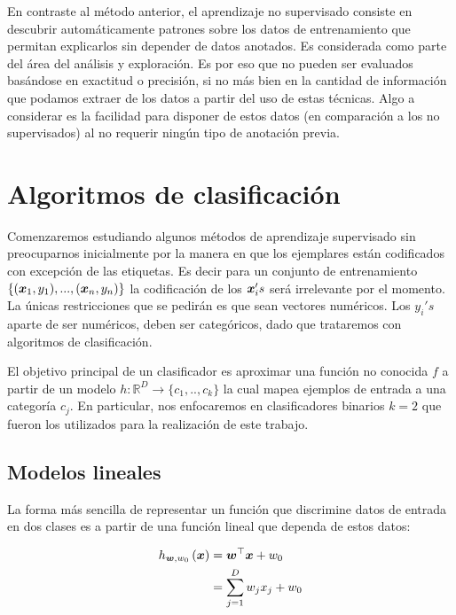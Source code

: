 En contraste al método anterior, el aprendizaje no supervisado consiste en
descubrir automáticamente patrones sobre los datos de entrenamiento que permitan
explicarlos sin depender de datos anotados. Es considerada como parte del área
del análisis y exploración. Es por eso que no pueden ser evaluados basándose en
exactitud o precisión, si no más bien en la cantidad de información que podamos
extraer de los datos a partir del uso de estas técnicas. Algo a considerar es la
facilidad para disponer de estos datos (en comparación a los no supervisados) al
no requerir ningún tipo de anotación previa.

\section{Algoritmos de clasificación}
\label{lit:algorithms}

Comenzaremos estudiando algunos métodos de aprendizaje supervisado sin
preocuparnos inicialmente por la manera en que los ejemplares están codificados
con excepción de las etiquetas. Es decir para un conjunto de entrenamiento
$\{(\boldsymbol{x}_1, y_1), ..., (\boldsymbol{x}_n, y_n)\}$ la codificación de los
$\boldsymbol{x}_i's$ será irrelevante por el momento. La únicas restricciones que se
pedirán es que sean vectores numéricos. Los $y_i's$ aparte de ser numéricos, deben
ser categóricos, dado que trataremos con algoritmos de clasificación.

El objetivo principal de un clasificador es aproximar una función no conocida
$f$ a partir de un modelo $h: \mathbb{R}^D \rightarrow \{c_1,.., c_k\}$ la cual
mapea ejemplos de entrada a una categoría $c_j$. En particular, nos enfocaremos
en clasificadores binarios $k = 2$ que fueron los utilizados para la realización
de este trabajo.

\subsection{Modelos lineales}

La forma más sencilla de representar un función que discrimine datos de entrada
en dos clases es a partir de una función lineal que dependa de estos datos:

\begin{align}
    h_{\boldsymbol{w}, w_0}\left( \boldsymbol{x} \right) &= \boldsymbol{w}^{\top} \boldsymbol{x} + w_0  \label{eq:linear_w_bias}\\
                                           &= \sum_{j = 1 }^{D} w_j x_j + w_0 \label{eq:linear_wo_bias}
\end{align}

